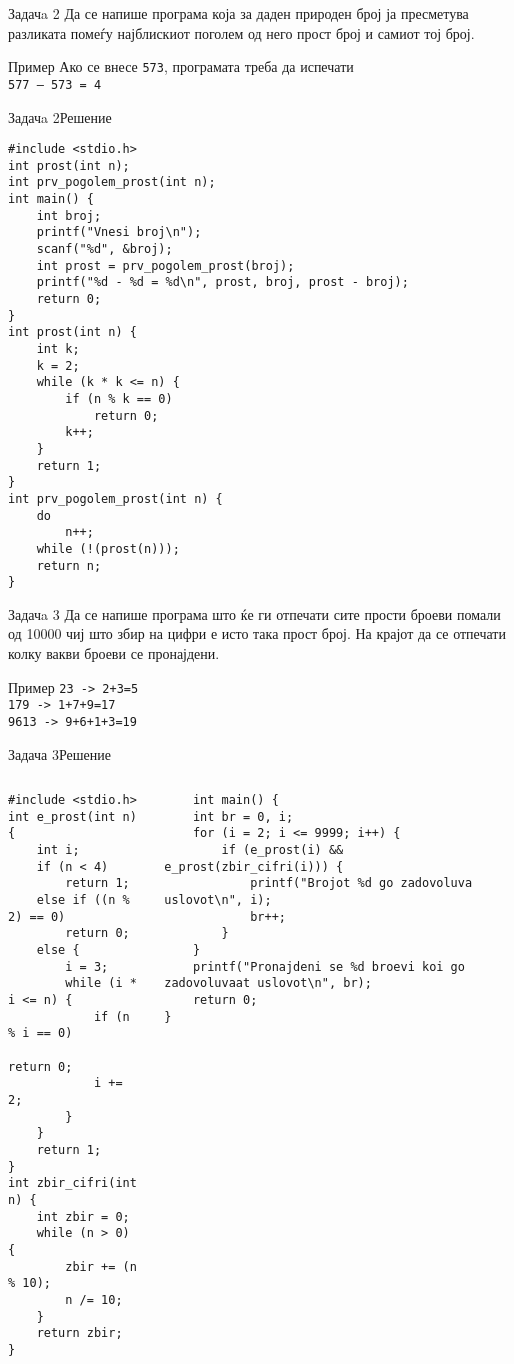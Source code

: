 \begin{frame}{Задачa 2}
Да се напише програма која за даден природен број ја пресметува разликата помеѓу најблискиот поголем од него прост број и самиот тој број.
\begin{exampleblock}{Пример}
Ако се внесе \texttt{573}, програмата треба да испечати\\
\texttt{577 – 573 = 4}
\end{exampleblock}
\end{frame}

\begin{frame}[fragile]{Задачa 2}{Решение} 
\begin{lstlisting}
#include <stdio.h>
int prost(int n);
int prv_pogolem_prost(int n);
int main() {
    int broj;
    printf("Vnesi broj\n");
    scanf("%d", &broj);
    int prost = prv_pogolem_prost(broj);
    printf("%d - %d = %d\n", prost, broj, prost - broj);
    return 0;
}
int prost(int n) {
    int k;
    k = 2;
    while (k * k <= n) {
        if (n % k == 0)
            return 0;
        k++;
    }
    return 1;
}
int prv_pogolem_prost(int n) {
    do
        n++;
    while (!(prost(n)));
    return n;
}
\end{lstlisting}
\end{frame}

\begin{frame}{Задачa 3}
Да се напише програма што ќе ги отпечати сите прости броеви помали од 10000 чиј
што збир на цифри е исто така прост број. На крајот да се отпечати колку вакви
броеви се пронајдени.
\begin{exampleblock}{Пример}
\texttt{23 -> 2+3=5}\\
\texttt{179 -> 1+7+9=17}\\
\texttt{9613 -> 9+6+1+3=19}
\end{exampleblock}
\end{frame}

\begin{frame}[fragile]{Задача 3}{Решение} 
\begin{columns}
    \begin{lstlisting}
#include <stdio.h>
int e_prost(int n) {
    int i;
    if (n < 4)
        return 1;
    else if ((n % 2) == 0)
        return 0;
    else {
        i = 3;
        while (i * i <= n) {
            if (n % i == 0)
                return 0;
            i += 2;
        }
    }
    return 1;
}
int zbir_cifri(int n) {
    int zbir = 0;
    while (n > 0) {
        zbir += (n % 10);
        n /= 10;
    }
    return zbir;
}
\end{lstlisting}
\begin{lstlisting}
    int main() {
    int br = 0, i;
    for (i = 2; i <= 9999; i++) {
        if (e_prost(i) && e_prost(zbir_cifri(i))) {
            printf("Brojot %d go zadovoluva uslovot\n", i);
            br++;
        }
    }
    printf("Pronajdeni se %d broevi koi go zadovoluvaat uslovot\n", br);
    return 0;
}
\end{lstlisting}
\end{columns}
\end{frame}

